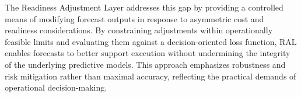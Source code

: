 The Readiness Adjustment Layer addresses this gap by providing a controlled means
of modifying forecast outputs in response to asymmetric cost and readiness
considerations. By constraining adjustments within operationally feasible limits
and evaluating them against a decision-oriented loss function, RAL enables
forecasts to better support execution without undermining the integrity of the
underlying predictive models. This approach emphasizes robustness and risk
mitigation rather than maximal accuracy, reflecting the practical demands of
operational decision-making.
